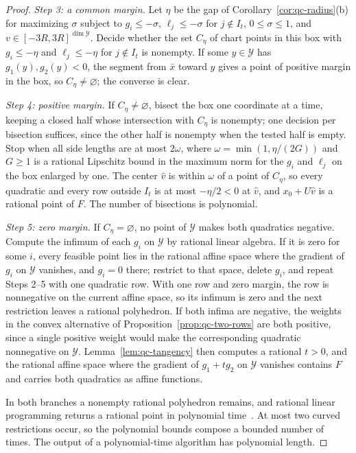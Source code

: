 \begin{proof}
\emph{Step 3: a common margin.} Let $\eta$ be the gap of
Corollary~\ref{cor:qc-radius}(b) for maximizing $\sigma$ subject to
$g_i\le-\sigma$, $\ell_j\le-\sigma$ for $j\notin I_t$, $0\le\sigma\le1$, and
$v\in[-3R,3R]^{\dim\mathcal Y}$. Decide whether the set $C_\eta$ of chart points
in this box with $g_i\le-\eta$ and $\ell_j\le-\eta$ for $j\notin I_t$ is
nonempty. If some $y\in\mathcal Y$ has $g_1(y),g_2(y)<0$, the segment from
$\bar x$ toward $y$ gives a point of positive margin in the box, so
$C_\eta\ne\varnothing$; the converse is clear.

\emph{Step 4: positive margin.} If $C_\eta\ne\varnothing$, bisect the box one
coordinate at a time, keeping a closed half whose intersection with $C_\eta$
is nonempty; one decision per bisection suffices, since the other half is
nonempty when the tested half is empty. Stop when all side lengths are at
most $2\omega$, where $\omega=\min(1,\eta/(2G))$ and $G\ge1$ is a rational
Lipschitz bound in the maximum norm for the $g_i$ and $\ell_j$ on the box
enlarged by one. The center $\hat v$ is within $\omega$ of a point of
$C_\eta$, so every quadratic and every row outside $I_t$ is at most
$-\eta/2<0$ at $\hat v$, and $x_0+U\hat v$ is a rational point of $F$. The
number of bisections is polynomial.

\emph{Step 5: zero margin.} If $C_\eta=\varnothing$, no point of $\mathcal Y$
makes both quadratics negative. Compute the infimum of each $g_i$ on $\mathcal Y$
by rational linear algebra. If it is zero for some $i$, every feasible point
lies in the rational affine space where the gradient of $g_i$ on $\mathcal Y$
vanishes, and $g_i=0$ there; restrict to that space, delete $g_i$, and repeat
Steps 2--5 with one quadratic row. With one row and zero margin, the row is
nonnegative on the current affine space, so its infimum is zero and the next
restriction leaves a rational polyhedron. If both infima are negative, the
weights in the convex alternative of Proposition~\ref{prop:qc-two-rows} are
both positive, since a single positive weight would make the corresponding
quadratic nonnegative on $\mathcal Y$. Lemma~\ref{lem:qc-tangency} then computes
a rational $t>0$, and the rational affine space where the gradient of
$g_1+tg_2$ on $\mathcal Y$ vanishes contains $F$ and carries both quadratics as
affine functions.

In both branches a nonempty rational polyhedron remains, and rational linear
programming returns a rational point in polynomial
time~\cite{GroetschelLovaszSchrijver1988}. At most two curved restrictions
occur, so the polynomial bounds compose a bounded number of times. The output
of a polynomial-time algorithm has polynomial length.
\end{proof}

